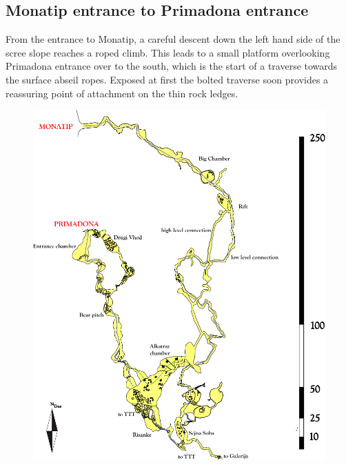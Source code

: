 \subsection{Monatip entrance to Primadona entrance}
From the entrance to Monatip, a careful descent down the left hand side of the scree slope reaches a roped climb. This leads to a small platform overlooking Primadona entrance over to the south, which is the start of a traverse towards the surface abseil ropes. Exposed at first  the bolted traverse soon provides a reassuring point of attachment on the thin rock ledges.


\begin{figure}[t!]
\centering
\includegraphics[height=\textheight]{PDF_maps/Prima-Mona-trip.pdf}
\label{prima mona trip}
\end{figure}
